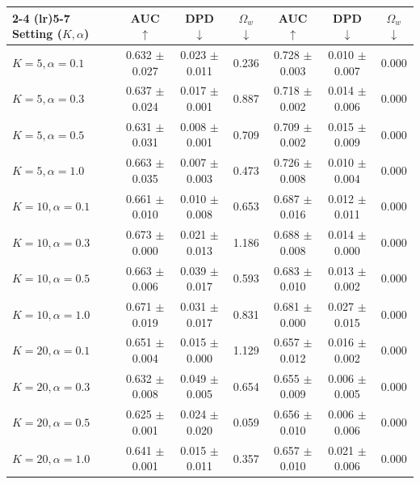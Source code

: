 \begin{table}[!t]
{\begin{tabular}{lcccccc}
\cmidrule(lr){2-4} \cmidrule(lr){5-7}
\textbf{Setting ($K, \alpha$)} & \textbf{AUC $\uparrow$} & \textbf{DPD $\downarrow$} & \textbf{$\Omega_w$ $\downarrow$} & \textbf{AUC $\uparrow$} & \textbf{DPD $\downarrow$} & \textbf{$\Omega_w$ $\downarrow$} \\
\midrule
$K = 5, \alpha = 0.1$ & 0.632 $\pm$ 0.027 & 0.023 $\pm$ 0.011 & 0.236 & 0.728 $\pm$ 0.003 & 0.010 $\pm$ 0.007 & 0.000 \\
$K = 5, \alpha = 0.3$ & 0.637 $\pm$ 0.024 & 0.017 $\pm$ 0.001 & 0.887 & 0.718 $\pm$ 0.002 & 0.014 $\pm$ 0.006 & 0.000 \\
$K = 5, \alpha = 0.5$ & 0.631 $\pm$ 0.031 & 0.008 $\pm$ 0.001 & 0.709 & 0.709 $\pm$ 0.002 & 0.015 $\pm$ 0.009 & 0.000 \\
$K = 5, \alpha = 1.0$ & 0.663 $\pm$ 0.035 & 0.007 $\pm$ 0.003 & 0.473 & 0.726 $\pm$ 0.008 & 0.010 $\pm$ 0.004 & 0.000 \\
\addlinespace[2pt]
$K = 10, \alpha = 0.1$ & 0.661 $\pm$ 0.010 & 0.010 $\pm$ 0.008 & 0.653 & 0.687 $\pm$ 0.016 & 0.012 $\pm$ 0.011 & 0.000 \\
$K = 10, \alpha = 0.3$ & 0.673 $\pm$ 0.000 & 0.021 $\pm$ 0.013 & 1.186 & 0.688 $\pm$ 0.008 & 0.014 $\pm$ 0.000 & 0.000 \\
$K = 10, \alpha = 0.5$ & 0.663 $\pm$ 0.006 & 0.039 $\pm$ 0.017 & 0.593 & 0.683 $\pm$ 0.010 & 0.013 $\pm$ 0.002 & 0.000 \\
$K = 10, \alpha = 1.0$ & 0.671 $\pm$ 0.019 & 0.031 $\pm$ 0.017 & 0.831 & 0.681 $\pm$ 0.000 & 0.027 $\pm$ 0.015 & 0.000 \\
\addlinespace[2pt]
$K = 20, \alpha = 0.1$ & 0.651 $\pm$ 0.004 & 0.015 $\pm$ 0.000 & 1.129 & 0.657 $\pm$ 0.012 & 0.016 $\pm$ 0.002 & 0.000 \\
$K = 20, \alpha = 0.3$ & 0.632 $\pm$ 0.008 & 0.049 $\pm$ 0.005 & 0.654 & 0.655 $\pm$ 0.009 & 0.006 $\pm$ 0.005 & 0.000 \\
$K = 20, \alpha = 0.5$ & 0.625 $\pm$ 0.001 & 0.024 $\pm$ 0.020 & 0.059 & 0.656 $\pm$ 0.010 & 0.006 $\pm$ 0.006 & 0.000 \\
$K = 20, \alpha = 1.0$ & 0.641 $\pm$ 0.001 & 0.015 $\pm$ 0.011 & 0.357 & 0.657 $\pm$ 0.010 & 0.021 $\pm$ 0.006 & 0.000 \\
\bottomrule
\end{tabular}%
}
\end{table}
